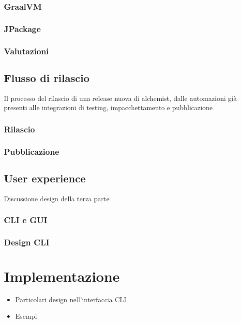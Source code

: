 \documentclass[12pt,a4paper,openright,twoside]{book}
\begin{document}
\subsection{GraalVM}

\subsection{JPackage}

\subsection{Valutazioni}

\section{Flusso di rilascio}
Il processo del rilascio di una release nuova di alchemist, dalle automazioni già presenti alle integrazioni di testing, impacchettamento e pubblicazione
\subsection{Rilascio}

\subsection{Pubblicazione}

\section{User experience}
Discussione design della terza parte

\subsection{CLI e GUI}

\subsection{Design CLI}

\chapter{Implementazione}

\begin{itemize}
	\item Particolari design nell'interfaccia CLI
	\item Esempi
\end{itemize}
\end{document}
